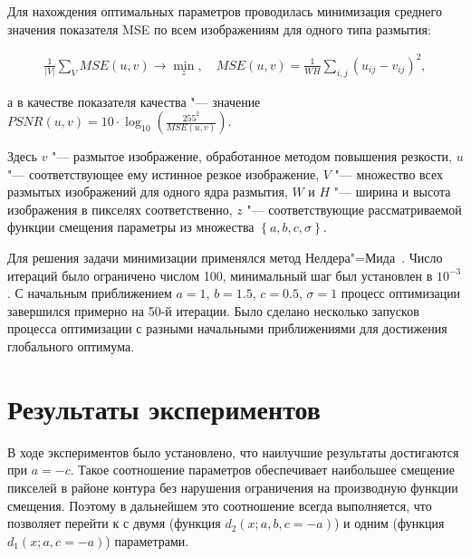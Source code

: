 

Для нахождения оптимальных параметров проводилась минимизация среднего значения показателя MSE по всем изображениям для одного типа размытия:

\begin{align*}
	\frac{1}{\left|V\right|}\sum_{V}{MSE\left(u,v\right) \rightarrow \min_{z}}, \quad
	MSE\left(u,v\right)=\frac{1}{WH}\sum_{i,j}{(u_{ij}-v_{ij})}^2,
\end{align*}

\noindent а в качестве показателя качества "--- значение $PSNR\left(u,v\right) = 10 \cdot \log_{10}{\left(\frac{255^2}{MSE\left(u,v\right)}\right)}$.

Здесь $v$ "--- размытое изображение, обработанное методом повышения резкости, $u$ "--- соответствующее ему истинное резкое изображение, $V$ "--- множество всех размытых изображений для одного ядра размытия, $W$ и $H$ "--- ширина и высота изображения в пикселях соответственно, $z$ "--- соответствующие рассматриваемой функции смещения параметры из множества $\left\{a, b, c, \sigma\right\}$.

Для решения задачи минимизации применялся метод Нелдера"=Мида~\cite{10.1093/comjnl/7.4.308}. Число итераций было ограничено числом 100, минимальный шаг был установлен в $10^{-3}$. С начальным приближением $a=1$, $b=1.5$, $c=0.5$, $\sigma=1$ процесс оптимизации завершился примерно на 50-й итерации. Было сделано несколько запусков процесса оптимизации с разными начальными приближениями для достижения глобального оптимума.

\section{Результаты экспериментов}

В ходе экспериментов было установлено, что наилучшие результаты достигаются при $a=-c$. Такое соотношение параметров обеспечивает наибольшее смещение пикселей в районе контура без нарушения ограничения на производную функции смещения. Поэтому в дальнейшем это соотношение всегда выполняется, что позволяет перейти к  с двумя (функция $d_2(x;a,b,c=-a)$) и одним (функция $d_1(x;a,c=-a)$) параметрами.


